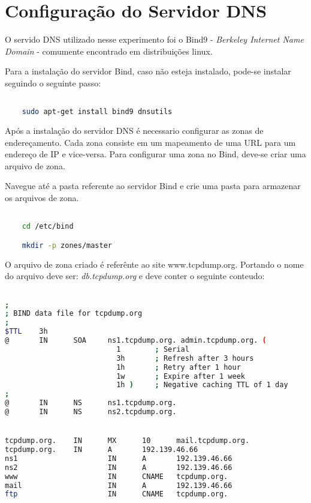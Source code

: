 \documentclass[a4paper]{report} %
\begin{document}
\section{Configuração do Servidor DNS}
\label{sec_configuracao}

O servido DNS utilizado nesse experimento foi o Bind9 - \textit{Berkeley Internet Name Domain} - comumente encontrado em distribuições linux.

Para a instalação do servidor Bind, caso não esteja instalado, pode-se instalar seguindo o seguinte passo:

\begin{lstlisting}[language=bash]

	sudo apt-get install bind9 dnsutils

\end{lstlisting}

Após a instalação do servidor DNS é necessario configurar as zonas de endereçamento. Cada zona consiste em um mapeamento de uma URL para um endereço de IP e vice-versa. Para configurar uma zona no Bind, deve-se criar uma arquivo de zona.

Navegue até a pasta referente ao servidor Bind e crie uma pasta para armazenar os arquivos de zona.

\begin{lstlisting}[language=bash]

	cd /etc/bind

	mkdir -p zones/master

\end{lstlisting}

O arquivo de zona criado é referênte ao site www.tcpdump.org. Portando o nome do arquivo deve ser: \textit{db.tcpdump.org} e deve conter o seguinte conteudo:

\begin{lstlisting}[language=bash]

;
; BIND data file for tcpdump.org
;
$TTL    3h
@       IN      SOA     ns1.tcpdump.org. admin.tcpdump.org. (
                          1        ; Serial
                          3h       ; Refresh after 3 hours
                          1h       ; Retry after 1 hour
                          1w       ; Expire after 1 week
                          1h )     ; Negative caching TTL of 1 day
;
@       IN      NS      ns1.tcpdump.org.
@       IN      NS      ns2.tcpdump.org.


tcpdump.org.    IN      MX      10      mail.tcpdump.org.
tcpdump.org.    IN      A       192.139.46.66
ns1                     IN      A       192.139.46.66
ns2                     IN      A       192.139.46.66
www                     IN      CNAME   tcpdump.org.
mail                    IN      A       192.139.46.66
ftp                     IN      CNAME   tcpdump.org.

\end{lstlisting}
\end{document}
